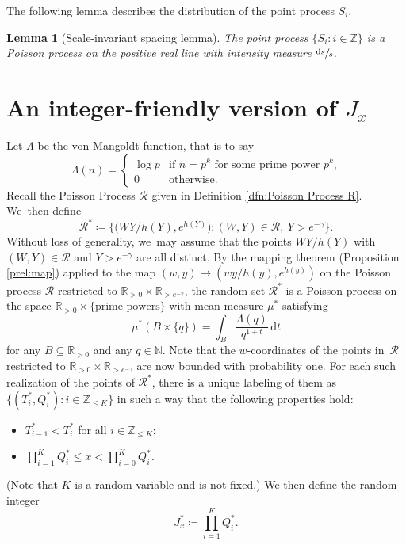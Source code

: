 \documentclass[10pt,a4paper]{article}
\newcommand{\NN}{\mathbb{N}}
\newcommand{\ZZ}{\mathbb{Z}}
\newcommand{\RR}{\mathbb{R}}
\newcommand{\RS}{\mathscr{R}}
\newcommand{\bg}{\big}
\theoremstyle{plain}
\newtheorem{lem}[cor]{Lemma}
\theoremstyle{definition}
\begin{document}
The following lemma describes the distribution of the point process $S_i$.

\begin{lem}[Scale-invariant spacing lemma]
\label{lem:scale-invariant-spacing-lemma}
The point process $\{S_i : i \in \ZZ\}$ is a Poisson process on the positive real line with intensity measure $\sfrac{\mathrm ds}{s}$.
\end{lem}

\section{An integer-friendly version of \texorpdfstring{$J_x$}{Jx}}
\label{sec:integer friendly J}

Let $\Lambda$ be the von Mangoldt function, that is to say
\[
\Lambda(n) = \begin{cases}
\log p &\text{if $n = p^k$ for some prime power $p^k$,} \\
0 &\text{otherwise.}
\end{cases}
\]
Recall the Poisson Process $\RS$ given in Definition \ref{dfn:Poisson Process R}. We~then define
\[
\RS^* \coloneqq \bg\{ \bg( WY/ h(Y), e^{h(Y)} \bg): (W,Y)\in \RS,\ Y > e^{-\gamma}\bg\}.
\]
Without loss of generality, we~may assume that the points $WY/h(Y)$ with $(W,Y)\in\RS$ and $Y>e^{-\gamma}$ are all distinct. By the mapping theorem (Proposition \ref{prel:map}) applied to the map $(w,y)\mapsto (wy/h(y),e^{h(y)})$ on the Poisson process $\RS$ restricted to $\RR_{>0} \times \RR_{>e^{-\gamma}}$, the random set $\RS^*$ is a Poisson process on the space $\RR_{>0}\times \{\text{prime powers}\}$ with mean measure $\mu^*$ satisfying
\[
\mu^*(B \times \{q\}) = \int_{B} \frac{\Lambda(q)}{q^{1+t}} \, \mathrm dt
\]
for any $B\subseteq\RR_{>0}$ and any $q\in\NN$. Note that the $w$-coordinates of the points in~$\RS$ restricted to $\RR_{>0} \times \RR_{>e^{-\gamma}}$ are now bounded with probability one. For each such realization of the points of $\RS^*$, there is a unique labeling of them as \hbox{$\{(T^*_i, Q^*_i):i \in \ZZ_{\le K}\}$} in such a way that the following properties hold:
\begin{itemize}
\item $T^*_{i-1} <T^*_{i}$ for all $i\in\ZZ_{\le K}$;
\item $\prod_{i=1}^K Q_i^*\le x< \prod_{i=0}^K Q_i^*$.
\end{itemize}
(Note that $K$ is a random variable and is not fixed.) We then define the random integer
\[
J_x^*\coloneqq \prod_{i=1}^K Q^*_i.
\]
\end{document}
